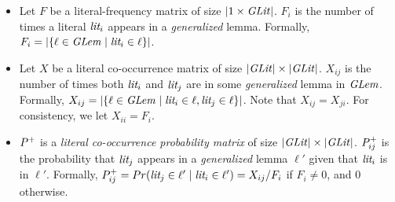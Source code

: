 \begin{itemize}
    \item Let $F$ be a literal-frequency matrix of size $|1\times\mathit{GLit}|$. $F_i$ is the number of times a literal $\textit{lit}_i$ appears in a \emph{generalized} lemma.
    Formally, $F_i = |\{ \ell \in \mathit{GLem} \mid \textit{lit}_i \in \ell\}|$.
    \item Let $X$ be a literal co-occurrence matrix of size $|\mathit{GLit}| \times |\mathit{GLit}|$. $X_{ij}$ is the number of times both $\textit{lit}_i$ and $\textit{lit}_j$ are in some \emph{generalized} lemma in $\mathit{GLem}$. Formally, $X_{ij} = |\{ \ell \in \mathit{GLem} \mid \textit{lit}_i \in \ell, \textit{lit}_j \in \ell\}|$.
    Note that $X_{ij} = X_{ji}$. For consistency, we let $X_{ii} = F_{i}$.
    \item $P^+$ is a \emph{literal co-occurrence probability matrix} of size $|\mathit{GLit}| \times |\mathit{GLit}|$. $P^+_{ij}$ is the probability that $\textit{lit}_j$ appears in a \emph{generalized} lemma $\ell'$ given that $\textit{lit}_i$ is in $\ell'$. Formally, $P^+_{ij} = Pr(\textit{lit}_j \in \ell' \mid \textit{lit}_i \in \ell') = X_{ij}/F_i$ if $F_i \neq 0$, and $0$ otherwise. 
    
\end{itemize}

